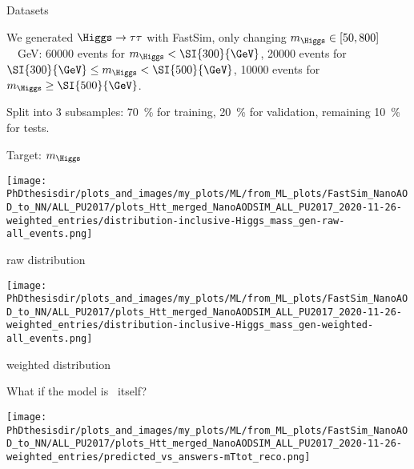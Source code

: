 \begin{frame}{Datasets}

\manip We generated $\Higgs\to\tau\tau$ with FastSim, only changing $m_{\Higgs} \in [50, 800]$~\SI{}{\GeV}:
\submanip \num{60000} events for $m_{\Higgs} < \SI{300}{\GeV}$,
\submanip \num{20000} events for $\SI{300}{\GeV} \leq m_{\Higgs} < \SI{500}{\GeV}$,
\submanip \num{10000} events for $m_{\Higgs} \geq \SI{500}{\GeV}$.

\vfill

\manip Split into 3 subsamples:
\submanip \SI{70}{\%} for training,
\submanip \SI{20}{\%} for validation,
\submanip remaining \SI{10}{\%} for tests.

\end{frame}


\begin{frame}{Target: $m_{\Higgs}$}

\begin{center}
\begin{minipage}[t]{.4\textwidth}
\begin{center}
\texttt{[image: \\PhDthesisdir/plots\_and\_images/my\_plots/ML/from\_ML\_plots/FastSim\_NanoAOD\_to\_NN/ALL\_PU2017/plots\_Htt\_merged\_NanoAODSIM\_ALL\_PU2017\_2020-11-26-weighted\_entries/distribution-inclusive-Higgs\_mass\_gen-raw-all\_events.png]}

raw distribution
\end{center}
\end{minipage}
\qquad\qquad
\begin{minipage}[t]{.4\textwidth}
\begin{center}
\texttt{[image: \\PhDthesisdir/plots\_and\_images/my\_plots/ML/from\_ML\_plots/FastSim\_NanoAOD\_to\_NN/ALL\_PU2017/plots\_Htt\_merged\_NanoAODSIM\_ALL\_PU2017\_2020-11-26-weighted\_entries/distribution-inclusive-Higgs\_mass\_gen-weighted-all\_events.png]}

weighted distribution
\end{center}
\end{minipage}
\end{center}

\end{frame}

\begin{frame}{What if the model is \mTtot\ itself?}
\begin{center}\vspace{-4pt}
\texttt{[image: \\PhDthesisdir/plots\_and\_images/my\_plots/ML/from\_ML\_plots/FastSim\_NanoAOD\_to\_NN/ALL\_PU2017/plots\_Htt\_merged\_NanoAODSIM\_ALL\_PU2017\_2020-11-26-weighted\_entries/predicted\_vs\_answers-mTtot\_reco.png]}
\end{center}\vspace{-5pt}
\end{frame}